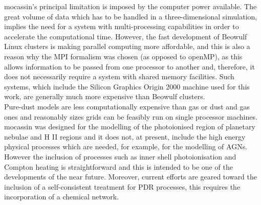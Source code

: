 \documentclass[11pt]{article}
\begin{document}
   {\sc mocassin}'s principal limitation is imposed by the computer power available. 
   The great volume of data which has to be handled in a three-dimensional 
   simulation, implies the need for a system with multi-processing capabilities in 
   order to accelerate the computational time. However, the fast development of 
   Beowulf Linux clusters is making parallel computing more affordable, and this is
   also a reason why the MPI formalism was chosen (as opposed to openMP), as this 
   allows information to be passed from one processor to another and, therefore, 
   it does not necessarily require a system with shared memory facilities. Such 
   systems, which include the Silicon Graphics Origin 2000 machine used for this 
   work, are generally much more expensive than Beowulf clusters. \\

   Pure-dust models are less computationally expensive than gas or dust and gas ones
   and reasonably sizes grids can be feasibly run on single processor machines. \\

   {\sc mocassin} was designed for the modelling of the photoionised region of planetary 
   nebulae and H II regions and it does not, at present, include the high energy 
   physical processes which are needed, for example,  for the modelling of AGNs. 
   However the inclusion of processes such as inner shell photoionisation and Compton 
   heating is straightforward and this is intended to be one of the developments of the near 
   future.  Moreover, current efforts are geared toward the inclusion of a self-consistent treatment 
   for PDR processes, this requires the incorporation of a chemical network. \\
\end{document}
